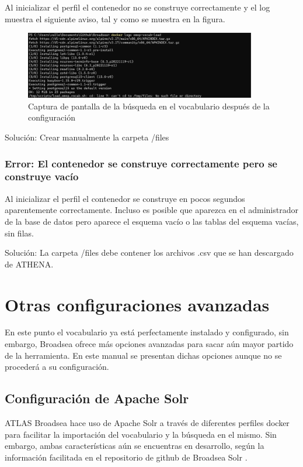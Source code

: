 Al inicializar el perfil  el contenedor no se construye correctamente y el log muestra el siguiente aviso, tal y como se muestra en la figura.

      \begin{figure}[H]
        \centering
        \includegraphics[width=0.90\textwidth]{figures/error05NoFile.png}
        \caption{Captura de pantalla de la búsqueda en el vocabulario después de la configuración}
        \label{fig:error05NoFile}
    \end{figure}
    
Solución: Crear manualmente la carpeta /files

\subsubsection{Error: El contenedor se construye correctamente pero se construye vacío}

Al inicializar el perfil  el contenedor se construye en pocos segundos aparentemente correctamente. Incluso es posible que aparezca en el administrador de la base de datos pero aparece el esquema vacío o las tablas del esquema vacías, sin filas.

Solución: La carpeta /files debe contener los archivos .csv que se han descargado de ATHENA.

\section{Otras configuraciones avanzadas}

En este punto el vocabulario ya está perfectamente instalado y configurado, sin embargo, Broadsea ofrece más opciones avanzadas para sacar aún mayor partido de la herramienta. En este manual se presentan dichas opciones aunque no se procederá a su configuración.

\subsection{Configuración de Apache Solr}

ATLAS Broadsea hace uso de Apache Solr a través de diferentes perfiles docker para facilitar la importación del vocabulario y la búsqueda en el mismo. Sin embargo, ambas características aún se encuentras en desarrollo, según la información facilitada en el repositorio de github de Broadsea Solr \cite{githubBroadseaSolr}.

